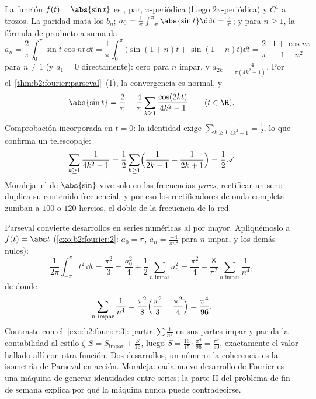 \begin{example}\label{ex:b2:fourier:abssin}
La función $f(t) = \abs{\sin t}$ es , par, $\pi$-periódica
(luego $2\pi$-periódica) y $C^1$ a trozos. La paridad mata los $b_n$;
$a_0 = \frac1\pi\int_{-\pi}^{\pi} \abs{\sin t}\dd t = \frac4\pi$; y
para $n \geq 1$, la fórmula de producto a suma da
\[
a_n = \frac2\pi\int_0^\pi \sin t\cos nt\,\dd t
= \frac{1}{\pi}\int_0^\pi\bigl(\sin(1+n)t +
\sin(1-n)t\bigr)\dd t
= \frac2\pi\cdot\frac{1 + \cos n\pi}{1 - n^2}
\]
para $n \neq 1$ (y $a_1 = 0$ directamente): cero para $n$ impar, y
$a_{2k} = \frac{-4}{\pi(4k^2-1)}$. Por el~\cref{thm:b2:fourier:parseval}~(1), la convergencia es normal, y
\[
\abs{\sin t} = \frac{2}{\pi} - \frac{4}{\pi}
\sum_{k\geq1}\frac{\cos(2kt)}{4k^2 - 1}
\qquad (t \in \R) .
\]
Comprobación incorporada en $t = 0$: la identidad exige
$\sum_{k\geq1}\frac{1}{4k^2-1} = \frac12$, lo que confirma un
telescopaje:
\[
\sum_{k\geq1}\frac{1}{4k^2-1}
= \frac12\sum_{k\geq1}\Bigl(\frac{1}{2k-1} -
\frac{1}{2k+1}\Bigr) = \frac12 . \checkmark
\]
Moraleja: el  de $\abs{\sin}$ vive solo en las frecuencias
\emph{pares}; rectificar un seno duplica su contenido frecuencial, y
por eso los rectificadores de onda completa zumban a $100$ o $120$
hercios, el doble de la frecuencia de la red.
\end{example}

\begin{example}\label{ex:b2:fourier:zetafourodd}
Parseval convierte desarrollos en series numéricas al por mayor.
Apliquémoslo a $f(t) = \abs t$ (\cref{exo:b2:fourier:2}: $a_0 = \pi$,
$a_n = \frac{-4}{\pi n^2}$ para $n$ impar, y los demás nulos):
\[
\frac{1}{2\pi}\int_{-\pi}^{\pi}t^2\,\dd t = \frac{\pi^2}{3}
= \frac{a_0^2}{4} + \frac12\sum_{n \text{ impar}} a_n^2
= \frac{\pi^2}{4} +
\frac{8}{\pi^2}\sum_{n\text{ impar}}\frac{1}{n^4} ,
\]
de donde
\[
\sum_{n\text{ impar}}\frac{1}{n^4}
= \frac{\pi^2}{8}\Bigl(\frac{\pi^2}{3} -
\frac{\pi^2}{4}\Bigr) = \frac{\pi^4}{96} .
\]
Contraste con el~\cref{exo:b2:fourier:3}: partir $\sum\frac1{n^4}$ en
sus partes impar y par da la contabilidad al estilo $\zeta$ $S =
S_{\mathrm{impar}} + \frac{S}{16}$, luego $S =
\frac{16}{15}\cdot\frac{\pi^4}{96} = \frac{\pi^4}{90}$, exactamente
el valor hallado allí con otra función. Dos desarrollos, un número:
la coherencia es la isometría de Parseval en acción. Moraleja: cada
nuevo desarrollo de Fourier es una máquina de generar identidades
entre series; la parte II del problema de fin de semana explica por
qué la máquina nunca puede contradecirse.
\end{example}

